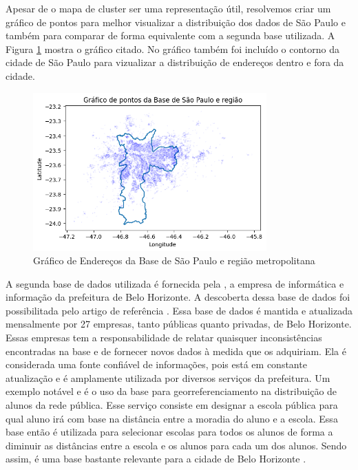 Apesar de o mapa de cluster ser uma representação útil, resolvemos criar um gráfico de pontos para melhor visualizar a distribuição dos dados de São Paulo e também para comparar de forma equivalente com a segunda base utilizada. A Figura \ref{fig:baseSP} mostra o gráfico citado. No gráfico também foi incluído o contorno da cidade de São Paulo para vizualizar a distribuição de endereços dentro e fora da cidade.

\begin{figure} 
    \centering
    \includegraphics[width=0.8\textwidth]{Figuras/spCompleta.png}
    \caption{Gráfico de Endereços da Base de São Paulo e região metropolitana}
    \label{fig:baseSP}
\end{figure}

A segunda base de dados utilizada é fornecida pela \cite{Prodabel}, a empresa de informática e informação da prefeitura de Belo Horizonte. A descoberta dessa base de dados foi possibilitada pelo artigo de referência \cite{Clodoveu2011}. Essa base de dados é mantida e atualizada mensalmente por 27 empresas, tanto públicas quanto privadas, de Belo Horizonte. Essas empresas tem a responsabilidade de relatar quaisquer inconsistências encontradas na base e de fornecer novos dados à medida que os adquiriam. Ela é considerada uma fonte confiável de informações, pois está em constante atualização e é amplamente utilizada por diversos serviços da prefeitura. Um exemplo notável e é o uso da base para georreferenciamento na distribuição de alunos da rede pública. Esse serviço consiste em designar a escola pública para qual aluno irá com base na distância entre a moradia do aluno e a escola. Essa base então é utilizada para selecionar escolas para todos os alunos de forma a diminuir as distâncias entre a escola e os alunos para cada um dos alunos. Sendo assim, é uma base bastante relevante para a cidade de Belo Horizonte \cite{Clodoveu2011}.

